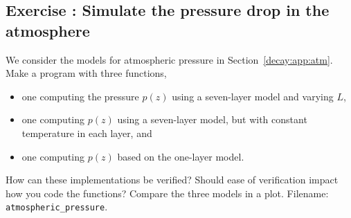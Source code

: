 \documentclass[graybox,sectrefs,envcountresetchap,open=right,final]{svmonodo}
\newenvironment{doconceexercise}{}{}
\newcounter{doconceexercisecounter}
\begin{document}
\begin{doconceexercise}

\subsection*{Exercise \thedoconceexercisecounter: Simulate the pressure drop in the atmosphere}

\label{decay:app:exer:atm1}

We consider the models for atmospheric pressure in
Section~\ref{decay:app:atm}.
Make a program with three functions,

\begin{itemize}
 \item one computing the pressure $p(z)$ using a seven-layer model
   and varying $L$,

 \item one computing $p(z)$ using a seven-layer model,
   but with constant temperature in each layer, and

 \item one computing $p(z)$ based on the
   one-layer model.
\end{itemize}

\noindent
How can these implementations be verified? Should ease of verification
impact how you code the functions?
Compare the three models in a plot.
\noindent Filename: \Verb!atmospheric_pressure!.

\end{doconceexercise}
\end{document}
